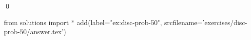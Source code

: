 
\begin{ex} 
  \label{ex:disc-prob-50}
  
  \qed
\end{ex} 
\begin{python0}
from solutions import *
add(label="ex:disc-prob-50",
    srcfilename='exercises/disc-prob-50/answer.tex') 
\end{python0}
